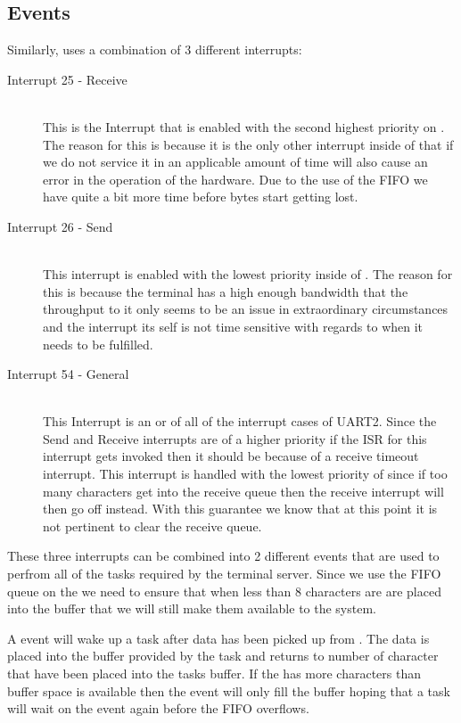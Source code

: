 \documentclass[pdftex,10pt,a4paper]{article}
\begin{document}
\subsection*{ Events}
Similarly,  uses a combination of 3 different interrupts:
\begin{description}
\item[Interrupt 25 -  Receive] \hfill \\
	This is the Interrupt that is enabled with the second highest priority
	on . The reason for this is because it is the only other
	interrupt inside of  that if we do not service it in an
	applicable amount of time will also cause an error in the operation of
	the hardware. Due to the use of the FIFO we have quite a bit more time
	before bytes start getting lost.
\item[Interrupt 26 -  Send] \hfill \\
	This interrupt is enabled with the lowest priority inside of
	. The reason for this is because the terminal has a high
	enough bandwidth that the throughput to it only seems to be an issue
	in extraordinary circumstances and the interrupt its self is not time
	sensitive with regards to when it needs to be fulfilled.
\item[Interrupt 54 -  General] \hfill \\
	This Interrupt is an or of all of the interrupt cases of UART2.
	Since the  Send and Receive interrupts are of a higher
	priority if the ISR for this interrupt gets invoked then it should
	be because of a receive timeout interrupt. This interrupt is handled
	with the lowest priority of  since if too many characters
	get into the receive queue then the  receive interrupt
	will then go off instead. With this guarantee we know that at this
	point it is not pertinent to clear the receive queue.
\end{description}

These three interrupts can be combined into 2 different events that are used to
perfrom all of the tasks required by the terminal server. Since we use the FIFO
queue on the  we need to ensure that when less than 8 characters are
are placed into the buffer that we will still make them available to the system.

A  event will wake up a task after data has been picked up
from . The data is placed into the buffer provided by the task and
returns to number of character that have been placed into the tasks buffer. If
the  has more characters than buffer space is available then the event
will only fill the buffer hoping that a task will wait on the event again
before the FIFO overflows.
\end{document}
